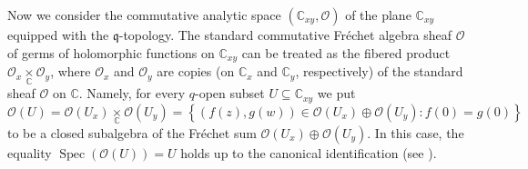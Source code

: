 \documentclass[12pt,reqno]{amsart}%
\theoremstyle{plain}
\numberwithin{theorem}{section} \numberwithin{equation}{section}
\numberwithin{lemma}{section}
\numberwithin{remark}{section}
\numberwithin{example}{section}
\numberwithin{proposition}{section}
\numberwithin{definition}{section}
\numberwithin{corollary}{section}
\begin{document}
Now we consider the commutative analytic space $\left(  \mathbb{C}%
_{xy},\mathcal{O}\right)  $ of the plane $\mathbb{C}_{xy}$ equipped with the
$\mathfrak{q}$-topology. The standard commutative Fr\'{e}chet algebra sheaf
$\mathcal{O}$ of germs of holomorphic functions on $\mathbb{C}_{xy}$ can be
treated as the fibered product $\mathcal{O}_{x}\underset{\mathbb{C}}{\times
}\mathcal{O}_{y}$, where $\mathcal{O}_{x}$ and $\mathcal{O}_{y}$ are copies
(on $\mathbb{C}_{x}$ and $\mathbb{C}_{y}$, respectively) of the standard sheaf
$\mathcal{O}$ on $\mathbb{C}$. Namely, for every $q$-open subset
$U\subseteq\mathbb{C}_{xy}$ we put
\[
\mathcal{O}\left(  U\right)  =\mathcal{O}\left(  U_{x}\right)
\underset{\mathbb{C}}{\times}\mathcal{O}\left(  U_{y}\right)  =\left\{
\left(  f\left(  z\right)  ,g\left(  w\right)  \right)  \in\mathcal{O}\left(
U_{x}\right)  \oplus\mathcal{O}\left(  U_{y}\right)  :f\left(  0\right)
=g\left(  0\right)  \right\}
\]
to be a closed subalgebra of the Fr\'{e}chet sum $\mathcal{O}\left(
U_{x}\right)  \oplus\mathcal{O}\left(  U_{y}\right)  $. In this case, the
equality $\operatorname{Spec}\left(  \mathcal{O}\left(  U\right)  \right)  =U$
holds up to the canonical identification (see \cite{Dosi25}).
\end{document}

